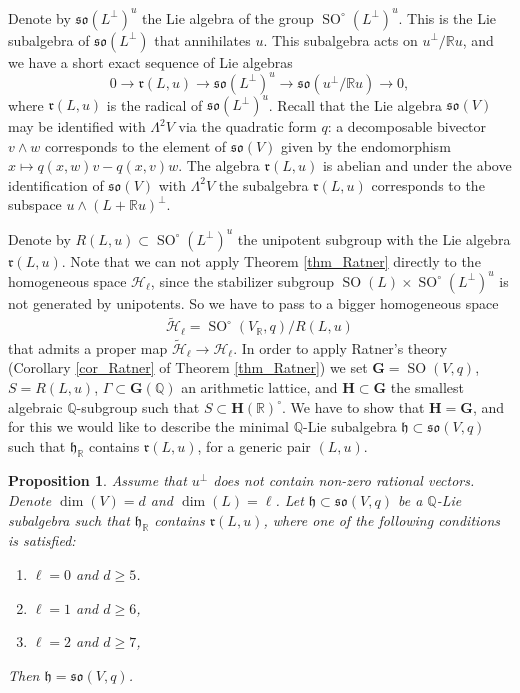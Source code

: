 \documentclass[11pt]{article}
\newcommand{\6}{\partial}
\newcommand{\bbQ}{\mathbb{Q}}
\newcommand{\bbR}{\mathbb{R}}
\newcommand{\HH}{\mathcal{H}}
\newcommand{\frh}{\mathfrak{h}}
\newcommand{\frr}{\mathfrak{r}}
\newcommand{\frso}{\mathfrak{so}}
\newcommand{\SO}{\operatorname{SO}}
\renewcommand{\ge}{\geqslant}
\newcommand{\wdg}{\wedge}
\newtheorem{prop}[defn]{Proposition}
\begin{document}
Denote by $\frso(L^\perp)^u$ the Lie algebra of the group $\SO^\circ(L^\perp)^u$.
This is the Lie subalgebra of $\frso(L^\perp)$ that annihilates $u$.
This subalgebra acts on $u^\perp/\bbR u$, and we have a short exact sequence of Lie algebras
$$
0\to \frr(L,u)\to \frso(L^\perp)^u \to \frso(u^\perp/\bbR u)\to 0,
$$
where $\frr(L,u)$ is the radical of $\frso(L^\perp)^u$.
Recall that the Lie algebra $\frso(V)$ may be identified with $\Lambda^2 V$
via the quadratic form $q$: a decomposable bivector $v\wdg w$ corresponds
to the element of $\frso(V)$ given by the endomorphism $x\mapsto q(x,w)v - q(x,v)w$.
The algebra $\frr(L,u)$ is abelian and under the above identification of $\frso(V)$ with $\Lambda^2 V$
the subalgebra $\frr(L,u)$ corresponds to the subspace $u\wdg (L+ \bbR u)^\perp$.

Denote by $R(L,u)\subset \SO^\circ(L^\perp)^u$ the unipotent subgroup with
the Lie algebra $\frr(L,u)$. Note that we can not apply Theorem \ref{thm_Ratner}
directly to the homogeneous space $\HH_\ell$, since the stabilizer subgroup
$\SO(L)\times \SO^\circ(L^\perp)^u$ is not generated by unipotents.
So we have to pass to a bigger homogeneous space
\begin{eqnarray}
\widetilde{\HH}_\ell = \SO^\circ(V_\bbR,q)/R(L,u)\label{eqn_Hbig}
\end{eqnarray}
that admits a proper map $\widetilde{\HH}_\ell \to \HH_\ell$.
In order to apply Ratner's theory (Corollary \ref{cor_Ratner} of Theorem \ref{thm_Ratner}) we
set $\mathbf{G} = \SO(V,q)$, $S = R(L,u)$, $\Gamma\subset \mathbf{G}(\bbQ)$ an
arithmetic lattice, and $\mathbf{H}\subset \mathbf{G}$ the smallest algebraic
$\bbQ$-subgroup such that $S\subset \mathbf{H}(\bbR)^\circ$. We have
to show that $\mathbf{H} = \mathbf{G}$, and for this we would like to describe
the minimal $\bbQ$-Lie subalgebra $\frh\subset \frso(V,q)$
such that $\frh_\bbR$ contains $\frr(L,u)$, for a generic pair $(L,u)$.

\begin{prop}\label{prop_algebra}
Assume that $u^\perp$ does not contain non-zero rational vectors.
Denote $\dim(V) = d$ and $\dim(L) = \ell$.
Let $\frh\subset \frso(V,q)$ be a $\bbQ$-Lie subalgebra 
such that $\frh_\bbR$ contains $\frr(L,u)$, where one of the following
conditions is satisfied:
\begin{enumerate}
\item $\ell = 0$ and $d\ge 5$.
\item $\ell = 1$ and $d\ge 6$,
\item $\ell = 2$ and $d\ge 7$,
\end{enumerate}
Then $\frh = \frso(V,q)$.
\end{prop}
\end{document}
